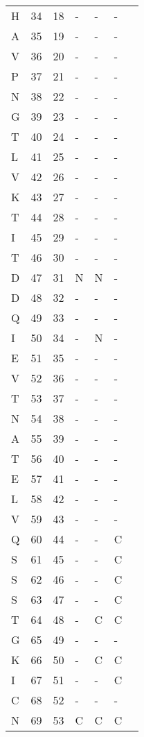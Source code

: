 \documentclass[10pt]{article}
\begin{document}
\begin{longtable}{lllllll}
  H &  34 & 18 & - & - & - &  \\ 
  A &  35 & 19 & - & - & - &  \\ 
  V &  36 & 20 & - & - & - &  \\ 
  P &  37 & 21 & - & - & - &  \\ 
  N &  38 & 22 & - & - & - &  \\ 
  G &  39 & 23 & - & - & - &  \\ 
  T &  40 & 24 & - & - & - &  \\ 
  L &  41 & 25 & - & - & - &  \\ 
  V &  42 & 26 & - & - & - &  \\ 
  K &  43 & 27 & - & - & - &  \\ 
  T &  44 & 28 & - & - & - &  \\ 
  I &  45 & 29 & - & - & - &  \\ 
  T &  46 & 30 & - & - & - &  \\ 
  D &  47 & 31 & N & N & - &  \\ 
  D &  48 & 32 & - & - & - &  \\ 
  Q &  49 & 33 & - & - & - &  \\ 
  I &  50 & 34 & - & N & - &  \\ 
  E &  51 & 35 & - & - & - &  \\ 
  V &  52 & 36 & - & - & - &  \\ 
  T &  53 & 37 & - & - & - &  \\ 
  N &  54 & 38 & - & - & - &  \\ 
  A &  55 & 39 & - & - & - &  \\ 
  T &  56 & 40 & - & - & - &  \\ 
  E &  57 & 41 & - & - & - &  \\ 
  L &  58 & 42 & - & - & - &  \\ 
  V &  59 & 43 & - & - & - &  \\ 
  Q &  60 & 44 & - & - & C &  \\ 
  S &  61 & 45 & - & - & C &  \\ 
  S &  62 & 46 & - & - & C &  \\ 
  S &  63 & 47 & - & - & C &  \\ 
  T &  64 & 48 & - & C & C &  \\ 
  G &  65 & 49 & - & - & - &  \\ 
  K &  66 & 50 & - & C & C &  \\ 
  I &  67 & 51 & - & - & C &  \\ 
  C &  68 & 52 & - & - & - &  \\ 
  N &  69 & 53 & C & C & C &  \\ 

\end{longtable}
\end{document}
